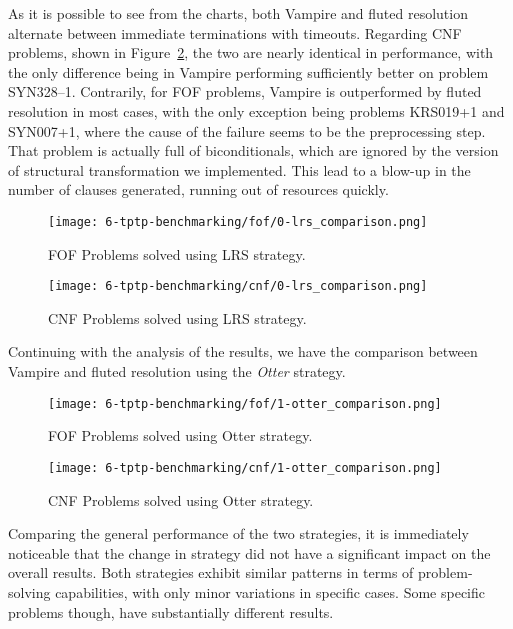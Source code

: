 As it is possible to see from the charts, both Vampire and fluted resolution alternate between immediate terminations with timeouts.
Regarding CNF problems, shown in Figure~\ref{fig:cnf-lrs}, the two are nearly identical in performance, with the only difference being in Vampire performing sufficiently better on problem SYN328--1.
Contrarily, for FOF problems, Vampire is outperformed by fluted resolution in most cases, with the only exception being problems KRS019+1 and SYN007+1, where the cause of the failure seems to be the preprocessing step.
That problem is actually full of biconditionals, which are ignored by the version of structural transformation we implemented. This lead to a blow-up in the number of clauses generated, running out of resources quickly.
\begin{figure}[H]
  \centering
  \texttt{[image: 6-tptp-benchmarking/fof/0-lrs\_comparison.png]}
  \caption{FOF Problems solved using LRS strategy.}\label{fig:fof-lrs}
\end{figure}

\begin{figure}[H]
  \centering
  \texttt{[image: 6-tptp-benchmarking/cnf/0-lrs\_comparison.png]}
  \caption{CNF Problems solved using LRS strategy.}\label{fig:cnf-lrs}
\end{figure}



Continuing with the analysis of the results, we have the comparison between Vampire and fluted resolution using the \emph{Otter} strategy.

\begin{figure}[H]
  \centering
  \texttt{[image: 6-tptp-benchmarking/fof/1-otter\_comparison.png]}
  \caption{FOF Problems solved using Otter strategy.}\label{fig:fof-otter}
\end{figure}

\begin{figure}[H]
  \centering
  \texttt{[image: 6-tptp-benchmarking/cnf/1-otter\_comparison.png]}
  \caption{CNF Problems solved using Otter strategy.}\label{fig:cnf-otter}
\end{figure}

Comparing the general performance of the two strategies, it is immediately noticeable that the change in strategy did not have a significant impact on the overall results. Both strategies exhibit similar patterns in terms of problem-solving capabilities, with only minor variations in specific cases.
Some specific problems though, have substantially different results.

